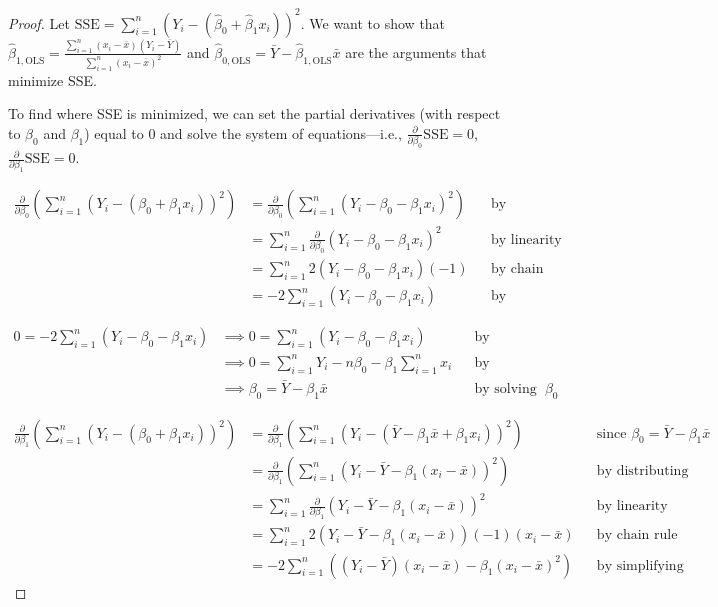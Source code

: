 \documentclass[12pt,oneside]{article}
\newcommand{\OLS}{\text{OLS}}
\newcommand{\SSE}{\text{SSE}}
\theoremstyle{definition}
\theoremstyle{remark}
\begin{document}
\begin{proof}
Let $\SSE = \sum_{i = 1}^{n} (Y_i - (\hat{\beta}_0 + \hat{\beta}_1 x_i))^2$. We want to show that $\hat{\beta}_{1, \OLS} = \frac{\sum_{i = 1}^{n} (x_i - \bar{x})(Y_i - \bar{Y})}{\sum_{i = 1}^{n} (x_i - \bar{x})^2}$ and $\hat{\beta}_{0, \OLS} = \bar{Y} - \hat{\beta}_{1, \OLS} \bar{x}$ are the arguments that minimize SSE.

To find where SSE is minimized, we can set the partial derivatives (with respect to $\beta_0$ and $\beta_1$) equal to 0 and solve the system of equations—i.e., $\frac{\partial}{\partial \beta_0} \SSE = 0$, $\frac{\partial}{\partial \beta_1} \SSE = 0$.

{
\scriptsize
\[
\begin{aligned}
\frac{\partial}{\partial \beta_0} \left( \sum_{i = 1}^{n} (Y_i - (\beta_0 + \beta_1 x_i))^2 \right) &= \frac{\partial}{\partial \beta_0} \left( \sum_{i = 1}^{n} (Y_i - \beta_0 - \beta_1 x_i)^2 \right) && \text{by distributing} \\
&= \sum_{i = 1}^{n} \frac{\partial}{\partial \beta_0} (Y_i - \beta_0 - \beta_1 x_i)^2 && \text{by linearity} \\
&= \sum_{i = 1}^{n} 2 (Y_i - \beta_0 - \beta_1 x_i) (-1) && \text{by chain rule} \\
&= -2 \sum_{i = 1}^{n} (Y_i - \beta_0 - \beta_1 x_i) && \text{by simplifying}
\end{aligned}
\]

\[
\begin{aligned}
0 = -2 \sum_{i = 1}^{n} (Y_i - \beta_0 - \beta_1 x_i) &\implies 0 = \sum_{i = 1}^{n} (Y_i - \beta_0 - \beta_1 x_i) && \text{by multiplying} \\
&\implies 0 = \sum_{i = 1}^{n} Y_i - n \beta_0 - \beta_1 \sum_{i = 1}^{n} x_i && \text{by linearity} \\
&\implies \beta_0 = \bar{Y} - \beta_1 \bar{x} && \text{by solving for $\beta_0$}
\end{aligned}
\]

\[
\begin{aligned}
\frac{\partial}{\partial \beta_1} \left( \sum_{i = 1}^{n} (Y_i - (\beta_0 + \beta_1 x_i))^2 \right) &= \frac{\partial}{\partial \beta_1} \left( \sum_{i = 1}^{n} (Y_i - (\bar{Y} - \beta_1 \bar{x} + \beta_1 x_i))^2 \right) && \text{since $\beta_0 = \bar{Y} - \beta_1 \bar{x}$} \\
&= \frac{\partial}{\partial \beta_1} \left( \sum_{i = 1}^{n} (Y_i - \bar{Y} - \beta_1 (x_i - \bar{x}))^2 \right) && \text{by distributing} \\
&= \sum_{i = 1}^{n} \frac{\partial}{\partial \beta_1} (Y_i - \bar{Y} - \beta_1 (x_i - \bar{x}))^2 && \text{by linearity} \\
&= \sum_{i = 1}^{n} 2 (Y_i - \bar{Y} - \beta_1 (x_i - \bar{x})) (-1) (x_i - \bar{x}) && \text{by chain rule} \\
&= -2 \sum_{i = 1}^{n} \left( (Y_i - \bar{Y})(x_i - \bar{x}) - \beta_1 (x_i - \bar{x})^2 \right) && \text{by simplifying}
\end{aligned}
\]

}
\end{proof}
\end{document}

